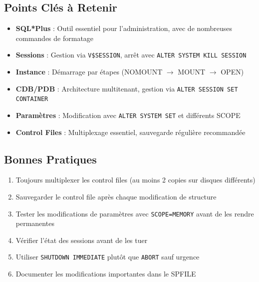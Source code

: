 \documentclass[12pt,a4paper]{article}
\begin{document}
\subsection{Points Clés à Retenir}

\begin{itemize}
    \item \textbf{SQL*Plus} : Outil essentiel pour l'administration, avec de nombreuses commandes de formatage
    \item \textbf{Sessions} : Gestion via \texttt{V\$SESSION}, arrêt avec \texttt{ALTER SYSTEM KILL SESSION}
    \item \textbf{Instance} : Démarrage par étapes (NOMOUNT $\rightarrow$ MOUNT $\rightarrow$ OPEN)
    \item \textbf{CDB/PDB} : Architecture multitenant, gestion via \texttt{ALTER SESSION SET CONTAINER}
    \item \textbf{Paramètres} : Modification avec \texttt{ALTER SYSTEM SET} et différents SCOPE
    \item \textbf{Control Files} : Multiplexage essentiel, sauvegarde régulière recommandée
\end{itemize}

\subsection{Bonnes Pratiques}

\begin{enumerate}
    \item Toujours multiplexer les control files (au moins 2 copies sur disques différents)
    \item Sauvegarder le control file après chaque modification de structure
    \item Tester les modifications de paramètres avec \texttt{SCOPE=MEMORY} avant de les rendre permanentes
    \item Vérifier l'état des sessions avant de les tuer
    \item Utiliser \texttt{SHUTDOWN IMMEDIATE} plutôt que \texttt{ABORT} sauf urgence
    \item Documenter les modifications importantes dans le SPFILE
\end{enumerate}
\end{document}
